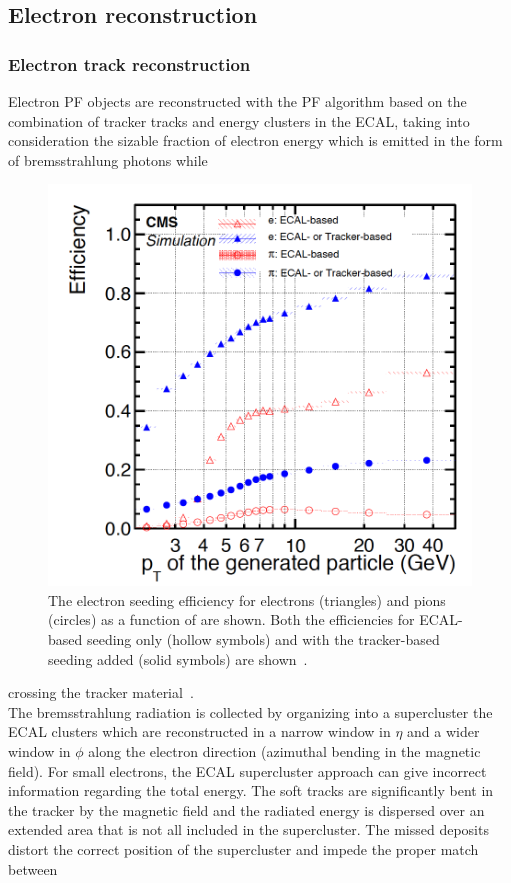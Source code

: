 \subsection{Electron reconstruction}\label{sec:c2ele}

\subsubsection{Electron track reconstruction}\label{sec:trackele}

Electron PF objects are reconstructed with the PF algorithm 
based on the combination of tracker tracks and energy clusters in the 
ECAL, taking into consideration the sizable fraction
of electron energy which is emitted in the form of bremsstrahlung
photons while
\begin{figure}
\centering
\includegraphics[width=.48\textwidth]{Figures/c2/eleecal}
  \caption{The electron seeding efficiency for electrons (triangles) and pions (circles) as a
function of \pt are shown. Both the efficiencies for ECAL-based
seeding only (hollow symbols) and with the tracker-based seeding added
(solid symbols) are shown~\cite{CMS:particleflow}.}
  \label{fig:c2ele}
\end{figure} 
crossing the tracker material~\cite{CMS:particleflow}.\\
 The bremsstrahlung radiation is collected
by organizing
 into a supercluster the ECAL clusters which are
reconstructed in a narrow window in $\eta$ and a wider window in $\phi$ along the electron direction (azimuthal
bending in the magnetic field).
For small \pt electrons, the ECAL supercluster approach can give
incorrect information regarding the total energy. The soft tracks are
significantly bent in the tracker by the magnetic field and the
radiated energy is dispersed over an extended area that is not all
included in the supercluster. The missed deposits distort the correct
position of the supercluster and impede the proper match between
